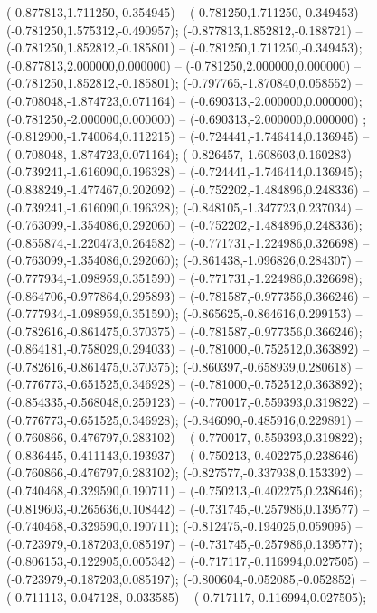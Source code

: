  (-0.877813,1.711250,-0.354945) -- (-0.781250,1.711250,-0.349453) -- (-0.781250,1.575312,-0.490957);
 (-0.877813,1.852812,-0.188721) -- (-0.781250,1.852812,-0.185801) -- (-0.781250,1.711250,-0.349453);
 (-0.877813,2.000000,0.000000) -- (-0.781250,2.000000,0.000000) -- (-0.781250,1.852812,-0.185801);
 (-0.797765,-1.870840,0.058552) -- (-0.708048,-1.874723,0.071164) -- (-0.690313,-2.000000,0.000000);
 (-0.781250,-2.000000,0.000000) -- (-0.690313,-2.000000,0.000000) ;
 (-0.812900,-1.740064,0.112215) -- (-0.724441,-1.746414,0.136945) -- (-0.708048,-1.874723,0.071164);
 (-0.826457,-1.608603,0.160283) -- (-0.739241,-1.616090,0.196328) -- (-0.724441,-1.746414,0.136945);
 (-0.838249,-1.477467,0.202092) -- (-0.752202,-1.484896,0.248336) -- (-0.739241,-1.616090,0.196328);
 (-0.848105,-1.347723,0.237034) -- (-0.763099,-1.354086,0.292060) -- (-0.752202,-1.484896,0.248336);
 (-0.855874,-1.220473,0.264582) -- (-0.771731,-1.224986,0.326698) -- (-0.763099,-1.354086,0.292060);
 (-0.861438,-1.096826,0.284307) -- (-0.777934,-1.098959,0.351590) -- (-0.771731,-1.224986,0.326698);
 (-0.864706,-0.977864,0.295893) -- (-0.781587,-0.977356,0.366246) -- (-0.777934,-1.098959,0.351590);
 (-0.865625,-0.864616,0.299153) -- (-0.782616,-0.861475,0.370375) -- (-0.781587,-0.977356,0.366246);
 (-0.864181,-0.758029,0.294033) -- (-0.781000,-0.752512,0.363892) -- (-0.782616,-0.861475,0.370375);
 (-0.860397,-0.658939,0.280618) -- (-0.776773,-0.651525,0.346928) -- (-0.781000,-0.752512,0.363892);
 (-0.854335,-0.568048,0.259123) -- (-0.770017,-0.559393,0.319822) -- (-0.776773,-0.651525,0.346928);
 (-0.846090,-0.485916,0.229891) -- (-0.760866,-0.476797,0.283102) -- (-0.770017,-0.559393,0.319822);
 (-0.836445,-0.411143,0.193937) -- (-0.750213,-0.402275,0.238646) -- (-0.760866,-0.476797,0.283102);
 (-0.827577,-0.337938,0.153392) -- (-0.740468,-0.329590,0.190711) -- (-0.750213,-0.402275,0.238646);
 (-0.819603,-0.265636,0.108442) -- (-0.731745,-0.257986,0.139577) -- (-0.740468,-0.329590,0.190711);
 (-0.812475,-0.194025,0.059095) -- (-0.723979,-0.187203,0.085197) -- (-0.731745,-0.257986,0.139577);
 (-0.806153,-0.122905,0.005342) -- (-0.717117,-0.116994,0.027505) -- (-0.723979,-0.187203,0.085197);
 (-0.800604,-0.052085,-0.052852) -- (-0.711113,-0.047128,-0.033585) -- (-0.717117,-0.116994,0.027505);
